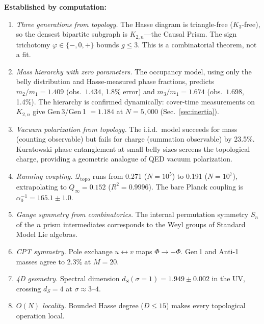 \documentclass[aps,prd,twocolumn,superscriptaddress,nofootinbib,amsmath,amssymb,longbibliography]{revtex4-2}
\newcommand{\ds}{d_S}
\newcommand{\Kbn}{K_{2,n}}
\newcommand{\Qtopo}{\mathcal{Q}_{\mathrm{topo}}}
\begin{document}
\textbf{Established by computation:}
\begin{enumerate}[itemsep=1pt,parsep=0pt,topsep=2pt,partopsep=0pt,leftmargin=1.8em]
  \item \emph{Three generations from topology.}
    The Hasse diagram is triangle-free ($K_3$-free), so the densest
    bipartite subgraph is $\Kbn$---the Causal Prism.
    The sign trichotomy $\varphi \in \{-,0,+\}$ bounds $g \leq 3$.
    This is a combinatorial theorem, not a fit.

  \item \emph{Mass hierarchy with zero parameters.}
    The occupancy model, using only the belly distribution and
    Hasse-measured phase fractions, predicts $m_2/m_1 = 1.409$ (obs.\
    $1.434$, 1.8\% error) and $m_3/m_1 = 1.674$ (obs.\ $1.698$, 1.4\%).
    The hierarchy is confirmed dynamically: cover-time measurements on
    $K_{2,n}$ give Gen\,3/Gen\,1 $= 1.184$ at $N = 5{,}000$
    (Sec.~\ref{sec:inertia}).

  \item \emph{Vacuum polarization from topology.}
    The i.i.d.\ model succeeds for mass (counting observable) but fails
    for charge (summation observable) by 23.5\%.  Kuratowski phase
    entanglement at small belly sizes screens the topological charge,
    providing a geometric analogue of QED vacuum polarization.

  \item \emph{Running coupling.}
    $\Qtopo$ runs from 0.271 ($N = 10^5$) to 0.191 ($N = 10^7$),
    extrapolating to $Q_\infty = 0.152$ ($R^2 = 0.9996$).
    The bare Planck coupling is $\alpha_0^{-1} = 165.1 \pm 1.0$.

  \item \emph{Gauge symmetry from combinatorics.}
    The internal permutation symmetry $S_n$ of the $n$ prism
    intermediates corresponds to the Weyl groups of Standard Model
    Lie algebras.

  \item \emph{CPT symmetry.}
    Pole exchange $u \leftrightarrow v$ maps $\Phi \to -\Phi$.
    Gen\,1 and Anti-1 masses agree to $2.3\%$ at $M{=}20$.

  \item \emph{4D geometry.}
    Spectral dimension $\ds(\sigma{=}1) = 1.949 \pm 0.002$ in the UV,
    crossing $\ds = 4$ at $\sigma \approx 3$--$4$.

  \item \emph{$O(N)$ locality.}
    Bounded Hasse degree ($D \leq 15$) makes every topological
    operation local.


\end{enumerate}
\end{document}
